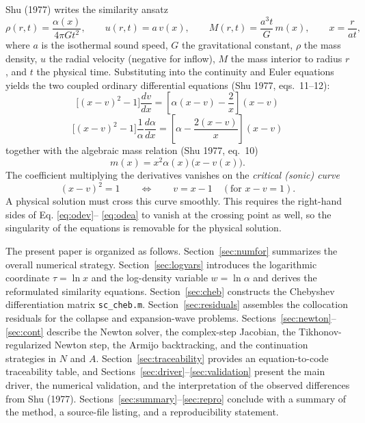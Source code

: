 \documentclass[11pt,a4paper]{article}
\begin{document}
Shu (1977) \cite{shu1977} writes the similarity ansatz
\begin{equation}
\rho(r,t) = \frac{\alpha(x)}{4\pi G t^{2}}, \qquad
u(r,t)    = a\,v(x), \qquad
M(r,t)    = \frac{a^{3}t}{G}\,m(x), \qquad
x = \frac{r}{a t},
\label{eq:ansatz}
\end{equation}
where $a$ is the isothermal sound speed, $G$ the gravitational constant,
$\rho$ the mass density, $u$ the radial velocity (negative for inflow),
$M$ the mass interior to radius $r$, and $t$ the physical time.
Substituting into the continuity and Euler equations yields the two
coupled ordinary differential equations (Shu 1977, eqs.~11--12):
\begin{equation}
\boxed{
\bigl[(x-v)^{2}-1\bigr]\frac{dv}{dx}
=
\left[\alpha(x-v)-\frac{2}{x}\right](x-v)
}
\label{eq:odev}
\end{equation}
\begin{equation}
\boxed{
\bigl[(x-v)^{2}-1\bigr]
\frac{1}{\alpha}\frac{d\alpha}{dx}
=
\left[\alpha-\frac{2(x-v)}{x}\right](x-v)
}
\label{eq:odea}
\end{equation}
together with the algebraic mass relation (Shu 1977, eq.~10)
\begin{equation}
m(x)=x^{2}\alpha(x)\bigl(x-v(x)\bigr).
\label{eq:mass}
\end{equation}
The coefficient multiplying the derivatives vanishes on the
\emph{critical (sonic) curve}
\begin{equation}
(x-v)^{2}=1
\qquad\Longleftrightarrow\qquad
v=x-1
\quad(\text{for } x-v=1).
\label{eq:critcurve}
\end{equation}
A physical solution must cross this curve smoothly. This requires the
right-hand sides of Eq. \eqref{eq:odev}-- \eqref{eq:odea} to vanish at the
crossing point as well, so the singularity of the equations is removable
for the physical solution.


The present paper is organized as follows. Section~\ref{sec:numfor}
summarizes the overall numerical strategy. Section~\ref{sec:logvars}
introduces the logarithmic coordinate $\tau=\ln x$ and the log-density
variable $w=\ln\alpha$ and derives the reformulated similarity
equations. Section~\ref{sec:cheb} constructs the Chebyshev
differentiation matrix \texttt{sc\_cheb.m}. Section~\ref{sec:residuals}
assembles the collocation residuals for the collapse and
expansion-wave problems.
Sections~\ref{sec:newton}--\ref{sec:cont} describe the Newton solver,
the complex-step Jacobian, the Tikhonov-regularized Newton step, the
Armijo backtracking, and the continuation strategies in $N$ and $A$.
Section~\ref{sec:traceability} provides an equation-to-code
traceability table, and Sections~\ref{sec:driver}--\ref{sec:validation}
present the main driver, the numerical validation, and the
interpretation of the observed differences from Shu (1977).
Sections~\ref{sec:summary}--\ref{sec:repro} conclude with a summary of
the method, a source-file listing, and a reproducibility statement.
\end{document}
